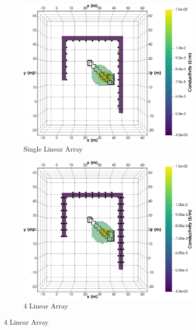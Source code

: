 \documentclass[preprint,authoryear,12pt]{elsarticle}
\begin{document}
\begin{figure}[htp]{}
   \begin{center}
      \begin{subfigure}{0.48\linewidth}
         \label{fig:SynthMosaic_Horseshoe_SingleLinear_Top}
         \includegraphics[trim=0cm 0cm 0cm 0cm, clip=true,width=\linewidth]{./figures/Fig15a.png}
         \caption{Single Linear Array}
      \end{subfigure}
      \hspace{-0.7cm}
      \qquad
      \begin{subfigure}{0.48\linewidth}
         \label{fig:SynthMosaic_Horseshoe_4Linear_Top}
         \includegraphics[trim=0cm 0cm 0cm 0cm, clip=true,width=\linewidth]{./figures/Fig15b.png}
         \caption{4 Linear Array}
      \end{subfigure}
      \vspace{0.2cm}


\end{center}
\end{figure}
\end{document}
